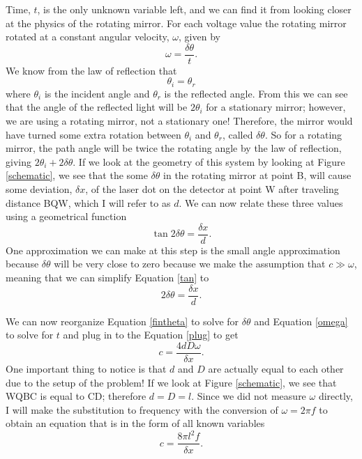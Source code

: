 \documentclass[aps,prl,10pt,twocolumn,floatfix]{revtex4-2}
\begin{document}
Time, $t$, is the only unknown variable left, and we can find it from looking closer at the physics of the rotating mirror.
For each voltage value the rotating mirror rotated at a constant angular velocity, $\omega$, given by 
\begin{equation}\label{omega}
\omega=\frac{\delta \theta}{t}.
\end{equation}
We know from the law of reflection that 
\begin{equation}
\theta_i = \theta_r
\end{equation}
where $\theta_i$ is the incident angle and $\theta_r$ is the reflected angle. 
From this we can see that the angle of the reflected light will be $2\theta_i$ for a stationary mirror;
however, we are using a rotating mirror, not a stationary one!
Therefore, the mirror would have turned some extra rotation between $\theta_i$ and $\theta_r$, called $\delta \theta$.
So for a rotating mirror, the path angle will be twice the rotating angle by the law of reflection, giving $2\theta_i + 2\delta \theta$. 
If we look at the geometry of this system by looking at Figure \ref{schematic}, we see that the some $\delta \theta$ in the rotating mirror at point B, will cause some deviation, $\delta x$, of the laser dot on the detector at point W after traveling distance BQW, which I will refer to as $d$.
We can now relate these three values using a geometrical function
\begin{equation}\label{tan}
\tan{2\delta \theta}=\frac{\delta x}{d}.
\end{equation}
One approximation we can make at this step is the small angle approximation because $\delta \theta$ will be very close to zero because we make the assumption that $c \gg \omega$, meaning that we can simplify Equation \ref{tan} to
\begin{equation}\label{fintheta}
2\delta \theta=\frac{\delta x}{d}.
\end{equation}

We can now reorganize Equation \ref{fintheta} to solve for $\delta \theta$ and Equation \ref{omega} to solve for $t$ and plug in to the Equation \ref{plug} to get 
\begin{equation}
c=\frac{4dD\omega}{\delta x}.
\end{equation}
One important thing to notice is that $d$ and $D$ are actually equal to each other due to the setup of the problem!
If we look at Figure \ref{schematic}, we see that WQBC is equal to CD;
therefore $d=D=l$.
Since we did not measure $\omega$ directly, I will make the substitution to frequency with the conversion of $\omega=2\pi f$ to obtain an equation that is in the form of all known variables
\begin{equation}\label{answer}
c=\frac{8\pi l^2f}{\delta x}.
\end{equation}
\end{document}
